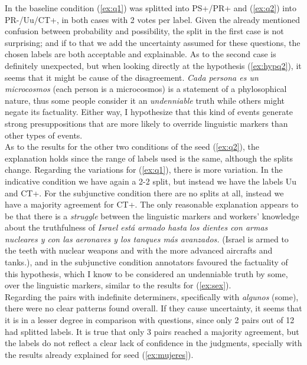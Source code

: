 In the baseline condition (\ref{ex:q1}) was splitted into PS+/PR+ and (\ref{ex:q2}) into PR-/Uu/CT+, in both cases with 2 votes per label. Given the already mentioned confusion between probability and possibility, the split in the first case is not surprising; and if to that we add the uncertainty assumed for these questions, the chosen labels are both acceptable and explainable. As to the second case is definitely unexpected, but when looking directly at the hypothesis (\ref{ex:hypq2}), it seems that it might be cause of the disagreement. \textit{Cada persona es un microcosmos} (each person is a microcosmos) is a statement of a phylosophical nature, thus some people consider it an \textit{undenniable} truth while others might negate its factuality. Either way, I hypothesize that this kind of events generate strong presuppositions that are more likely to override linguistic markers than other types of events.\\

As to the results for the other two conditions of the seed (\ref{ex:q2}), the explanation holds since the range of labels used is the same, although the splits change. Regarding the variations for (\ref{ex:q1}), there is more variation. In the indicative condition we have again a 2-2 split, but instead we have the labels Uu and CT+. For the subjunctive condition there are no splits at all, instead we have a majority agreement for CT+. The only reasonable explanation appears to be that there is a \textit{struggle} between the linguistic markers and workers' knowledge about the truthfulness of \textit{Israel está armado hasta los dientes con armas nucleares y con las aeronaves y los tanques más avanzados.} (Israel is armed to the teeth with nuclear weapons and with the more advanced aircrafts and tanks.), and in the subjunctive condition annotators favoured the factuality of this hypothesis, which I know to be considered an undenniable truth by some, over the linguistic markers, similar to the results for (\ref{ex:sex}).\\

Regarding the pairs with indefinite determiners, specifically with \textit{algunos} (some), there were no clear patterns found overall. If they cause uncertainty, it seems that it is in a lesser degree in comparison with questions, since only 2 pairs out of 12 had splitted labels. It is true that only 3 pairs reached a majority agreement, but the labels do not reflect a clear lack of confidence in the judgments, specially with the results already explained for seed (\ref{ex:mujeres}).\\

